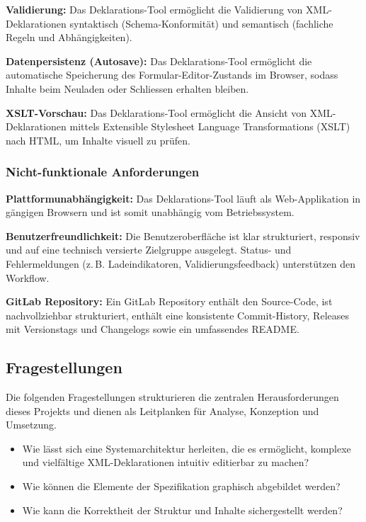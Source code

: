\documentclass[a4paper,12pt]{article}
\begin{document}
\noindent\textbf{Validierung:}
Das Deklarations-Tool ermöglicht die Validierung von XML-Deklarationen syntaktisch (Schema-Konformität) und 
semantisch (fachliche Regeln und Abhängigkeiten).
\newline

\noindent\textbf{Datenpersistenz (Autosave):}
Das Deklarations-Tool ermöglicht die automatische Speicherung des Formular-Editor-Zustands im Browser, sodass 
Inhalte beim Neuladen oder Schliessen erhalten bleiben.
\newline

\noindent\textbf{XSLT-Vorschau:}
Das Deklarations-Tool ermöglicht die Ansicht von XML-Deklarationen mittels Extensible Stylesheet Language 
Transformations (XSLT) nach HTML, um Inhalte visuell zu prüfen.

\subsubsection{Nicht-funktionale Anforderungen}

\noindent\textbf{Plattformunabhängigkeit:}
Das Deklarations-Tool läuft als Web-Applikation in gängigen Browsern und ist somit unabhängig vom 
Betriebssystem.
\newline

\noindent\textbf{Benutzerfreundlichkeit:}
Die Benutzeroberfläche ist klar strukturiert, responsiv und auf eine technisch versierte Zielgruppe 
ausgelegt. Status- und Fehlermeldungen (z.\,B. Ladeindikatoren, Validierungsfeedback) unterstützen den 
Workflow.
\newline

\noindent\textbf{GitLab Repository:}
Ein GitLab Repository enthält den Source-Code, ist nachvollziehbar strukturiert, enthält eine konsistente 
Commit-History, Releases mit Versionstags und Changelogs sowie ein umfassendes README.

\subsection{Fragestellungen}
\label{sec:fragestellungen}

\noindent Die folgenden Fragestellungen strukturieren die zentralen Herausforderungen dieses Projekts und dienen 
als Leitplanken für Analyse, Konzeption und Umsetzung.

\begin{itemize}
    \item Wie lässt sich eine Systemarchitektur herleiten, die es ermöglicht, komplexe und vielfältige 
    XML-Deklarationen intuitiv editierbar zu machen?
    \item Wie können die Elemente der Spezifikation graphisch abgebildet werden?
    \item Wie kann die Korrektheit der Struktur und Inhalte sichergestellt werden?
\end{itemize}
\end{document}
